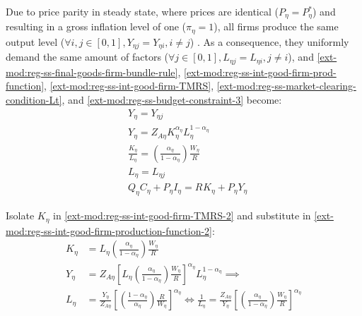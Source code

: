\documentclass[../thesis.tex]{subfiles}
\begin{document}
Due to price parity in steady state, where prices are identical ($P_{\eta} = P_{\eta}^{\ast}$) and resulting in a gross inflation level of one ($\pi_{\eta} = 1$), all firms produce the same output level ($\forall i, j \in [0,1], Y_{\eta j} = Y_{\eta i}, i \neq j$) \cite[Lecture 13, p.12]{solis-garcia_ucb_2022}. As a consequence, they uniformly demand the same amount of factors ($\forall j \in [0,1], L_{\eta j} = L_{\eta i}, j \neq i$), and \ref{ext-mod:reg-ss-final-goods-firm-bundle-rule}, \ref{ext-mod:reg-ss-int-good-firm-prod-function}, \ref{ext-mod:reg-ss-int-good-firm-TMRS}, \ref{ext-mod:reg-ss-market-clearing-condition-Lt}, and \ref{ext-mod:reg-ss-budget-constraint-3} become:
\begin{align}
	& Y_{\eta} = Y_{\eta j} \label{ext-mod:reg-ss-final-goods-firm-bundle-rule-2} \\
	& Y_{\eta} = Z_{A\eta} K_{\eta}^{\alpha_{\eta}} L_{\eta}^{1-{\alpha_{\eta}}} \label{ext-mod:reg-ss-int-good-firm-production-function-2} \\
	& \frac{K_{\eta}}{L_{\eta}} = \left( \frac{{\alpha_{\eta}}}{1-\alpha_{\eta}} \right) \frac{W_{\eta}}{R_{}} \label{ext-mod:reg-ss-int-good-firm-TMRS-2} \\
	& L_{\eta} = L_{\eta j} \label{ext-mod:reg-ss-market-clearing-condition-Lt-2} \\
	& Q_{\eta} C_{\eta} + P_{\eta} I_{\eta} = R_{} K_{\eta} + P_{\eta} Y_{\eta} \label{ext-mod:reg-ss-budget-constraint-4}
\end{align}


Isolate $K_{\eta}$ in \ref{ext-mod:reg-ss-int-good-firm-TMRS-2} and substitute in \ref{ext-mod:reg-ss-int-good-firm-production-function-2}:
\begin{align}
	K_{\eta} &= L_{\eta} \left( \frac{{\alpha_{\eta}}}{1-\alpha_{\eta}} \right) \frac{W_{\eta}}{R_{}} \nonumber \\
	Y_{\eta} &= Z_{A\eta} \left[ L_{\eta} \left( \frac{{\alpha_{\eta}}}{1-\alpha_{\eta}} \right) \frac{W_{\eta}}{R_{}} \right]^{\alpha_{\eta}} L_{\eta}^{1-{\alpha_{\eta}}} \implies \nonumber \\
	L_{\eta} &= \frac{Y_{\eta}}{Z_{A\eta}} \left[ \left( \frac{1-\alpha_{\eta}}{{\alpha_{\eta}}} \right) \frac{R}{W_{\eta}} \right]^{\alpha_{\eta}} \iff %
	\frac{1}{L_{\eta}} = \frac{Z_{A\eta}}{Y_{\eta}} \left[ \left( \frac{{\alpha_{\eta}}}{1-\alpha_{\eta}} \right) \frac{W_{\eta}}{R} \right]^{\alpha_{\eta}} \label{ext-mod:reg-ss-int-good-firm-production-function-3}
\end{align}
\end{document}
